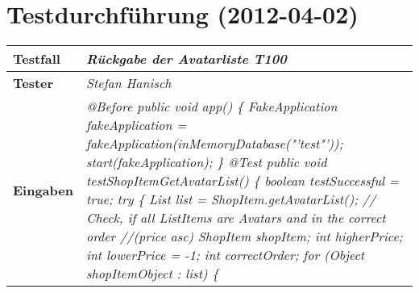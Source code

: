 
\chapter{Testdurchführung (2012-04-02)}

\begin{longtable}{|p{4cm}|p{11cm}|}
\hline
\textbf{Testfall} & \textit{Rückgabe der Avatarliste \textbf{T100}} \\
\hline
\textbf{Tester} & \textit{Stefan Hanisch} \\
\hline
\textbf{Eingaben} & \textit{@Before \newline
public void app() \{ \newline
\hspace*{1mm}FakeApplication fakeApplication \newline
\hspace*{4mm}= fakeApplication(inMemoryDatabase("'test"'));\newline
\hspace*{1mm}start(fakeApplication); \newline
\} \newline
\newline
@Test \newline
public void testShopItemGetAvatarList() \{\newline
\hspace*{1mm}boolean testSuccessful = true; \newline
\hspace*{1mm}try \{\newline
\hspace*{3mm}List list = ShopItem.getAvatarList();\newline
\hspace*{3mm}// Check, if all ListItems are Avatars and in the correct order \newline
\hspace*{3mm}//(price asc) \newline
\hspace*{3mm}ShopItem shopItem; \newline
\hspace*{3mm}int higherPrice; \newline
\hspace*{3mm}int lowerPrice = -1;\newline
\hspace*{3mm}int correctOrder;\newline
\hspace*{3mm}for (Object shopItemObject : list) \{\newline
}
\end{longtable}
